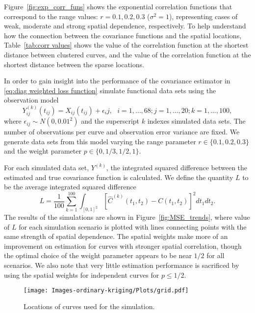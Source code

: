 Figure~\ref{fig:exp_corr_funs} shows the exponential correlation functions that correspond to the range values: $r = 0.1, 0.2, 0.3$ ($\sigma^2=1$), representing cases of weak, moderate and strong spatial dependence, respectively. To help understand how the connection between the covariance functions and the spatial locations, Table~\ref{tab:corr values} shows the value of the correlation function at the shortest distance between clustered curves, and the value of the correlation function at the shortest distance between the sparse locations. 

In order to gain insight into the performance of the covariance estimator in \eqref{eq:diag weighted loss function} simulate functional data sets using the observation model 
\begin{equation}
	Y^{(k)}_{ij}(t_{ij}) = X_{ij}(t_{ij}) + \epsilon_ij, \mbox{ } i = 1, \dots, 68; j = 1, \dots, 20; k = 1, \dots, 100,
\end{equation}
where $\epsilon_{ij} \sim N(0, 0.01^2)$ and the superscript $k$ indexes simulated data sets. The number of observations per curve and observation error variance are fixed. We generate data sets from this model varying the range parameter $r \in \{0.1, 0.2, 0.3\}$ and the weight parameter $p \in \{0, 1/3, 1/2, 1\}$. 

For each simulated data set, $Y^{(k)}$, the integrated squared difference between the estimated and true covariance function is calculated. We define the quantity $L$ to be the average integrated squared difference
\begin{equation}
	L = \frac{1}{100}\sum_{k=1}^{100}\int_{[0,1]^2} [\hat{C}^{(k)}(t_1, t_2) - C(t_1,t_2)]^2dt_1dt_2.
\end{equation}
The results of the simulations are shown in Figure~\ref{fig:MSE_trends}, where value of $L$ for each simulation scenario is plotted with lines connecting points with the same strength of spatial dependence. The spatial weights make more of an improvement on estimation for curves with stronger spatial correlation, though the optimal choice of the weight parameter appears to be near $1/2$ for all scenarios. We also note that very little estimation performance is sacrificed by using the spatial weights for independent curves for $p \leq 1/2$.

\begin{figure}[h]
	\begin{center}
		\texttt{[image: Images-ordinary-kriging/Plots/grid.pdf]} 
	\end{center}
	\caption{Locations of curves used for the simulation.} \label{fig:grid3} 
\end{figure}


